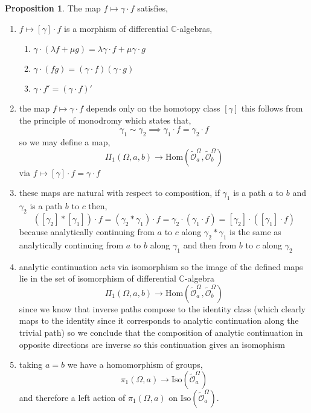 \documentclass[12pt]{extarticle}
\newcommand{\C}{\mathbb{C}}
\theoremstyle{definition}
\newtheorem{proposition}[theorem]{Proposition}
\renewcommand{\O}{\mathcal{O}}
\begin{document}
\begin{proposition}
The map $f \mapsto \gamma \cdot f$ satisfies,
\begin{enumerate}
\item $f \mapsto [\gamma] \cdot f$ is a morphism of differential $\C$-algebras,
\begin{enumerate}
\item $\gamma \cdot (\lambda f + \mu g) = \lambda \gamma \cdot f + \mu \gamma \cdot g$
\item $\gamma \cdot (fg) = (\gamma \cdot f) (\gamma \cdot g)$
\item $\gamma \cdot f' = (\gamma \cdot f)'$
\end{enumerate}
\item the map $f \mapsto \gamma \cdot f$ depends only on the homotopy class $[\gamma]$ this follows from the principle of monodromy which states that,
\[ \gamma_1 \sim \gamma_2 \implies \gamma_1 \cdot f = \gamma_2 \cdot f \]
so we may define a map,
\[ \Pi_1(\Omega, a, b) \to \text{Hom}(\tilde{\O}_a^\Omega, \tilde{\O}_b^\Omega) \]
via $f \mapsto [\gamma] \cdot f = \gamma \cdot f$
\item these maps are natural with respect to composition, if $\gamma_1$ is a path $a$ to $b$ and $\gamma_2$ is a path $b$ to $c$ then,
\[ ([\gamma_2] * [\gamma_1]) \cdot f = (\gamma_2 * \gamma_1) \cdot f = \gamma_2 \cdot (\gamma_1 \cdot f) = [\gamma_2] \cdot ([\gamma_1] \cdot f) \]
because analytically continuing from $a$ to $c$ along $\gamma_2 * \gamma_1$ is the same as analytically continuing from $a$ to $b$ along $\gamma_1$ and then from $b$ to $c$ along $\gamma_2$
\item analytic continuation acts via isomorphism so the image of the defined maps lie in the set of isomorphism of differential $\C$-algebra
\[ \Pi_1(\Omega, a, b) \to \text{Hom}(\tilde{\O}_a^\Omega, \tilde{\O}_b^\Omega) \] 
since we know that inverse paths compose to the identity class (which clearly maps to the identity since it corresponds to analytic continuation along the trivial path) so we conclude that the composition of analytic continuation in opposite directions are inverse so this continuation gives an isomophism
\item taking $a = b$ we have a homomorphism of groups,
\[ \pi_1(\Omega, a) \to \mathrm{Iso}(\tilde{\O}_a^\Omega) \]
and therefore a left action of $\pi_1(\Omega, a)$ on $\mathrm{Iso}(\tilde{\O}_a^\Omega)$. 
\end{enumerate}
\end{proposition}
\end{document}
